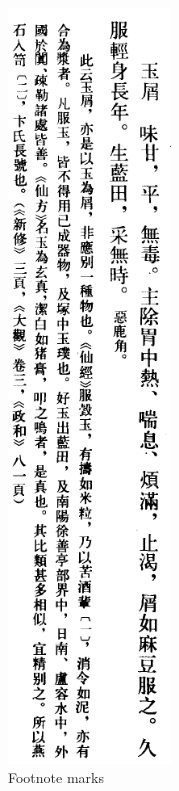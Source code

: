 \documentclass[fontsize=11pt, paper=a4, 
  DIV15,
  normalheadings,
  parskip=half-, 
  pointlessnumbers]{scrartcl}
\begin{document}
\begin{figure}[h]
  \begin{minipage}[b]{5 cm}
    \begin{centering}
    \includegraphics[height=20cm]{image1}
    \caption{Footnote marks}
    \label{fig1}
    \end{centering}
  \end{minipage}
  \begin{minipage}[b]{5 cm}
    \begin{centering}

\end{centering}
\end{minipage}
\end{figure}
\end{document}
